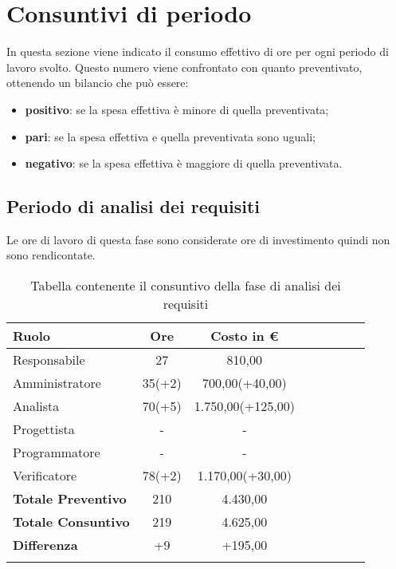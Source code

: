 \section{Consuntivi di periodo} \label{_consuntivo}
In questa sezione viene indicato il consumo effettivo di ore per ogni periodo di lavoro svolto. Questo numero viene confrontato con quanto preventivato, ottenendo un bilancio che può essere:
\begin{itemize}
    \item \textbf{positivo}: se la spesa effettiva è minore di quella preventivata;
    \item \textbf{pari}: se la spesa effettiva e quella preventivata sono uguali;
    \item \textbf{negativo}:  se la spesa effettiva è maggiore di quella preventivata.
\end{itemize}

\subsection{Periodo di analisi dei requisiti} \label{_consuntivoAnalisiDeiRequisiti}
Le ore di lavoro di questa fase sono considerate ore di investimento quindi non sono rendicontate.
            				
			\begin{longtable}{|l|c|c|c|c|c|c|c|}
				\hline
				\rowcolor{lighter-grayer}
				\textbf{Ruolo} & \textbf{Ore} & \textbf{Costo in €} \\
				\hline
				\endfirsthead
				
				\hline
				Responsabile & 27 & 810,00\\
				\hline
				\hline
				Amministratore & 35(+2) & 700,00(+40,00)\\
				\hline
				\hline
				Analista & 70(+5) & 1.750,00(+125,00)\\
				\hline
				\hline
				Progettista & - & -\\
				\hline
				\hline
				Programmatore & - & -\\
				\hline
				\hline
				Verificatore & 78(+2) & 1.170,00(+30,00)\\
				\hline
                \textbf{Totale Preventivo} & 210 & 4.430,00\\
                \hline
				\hline
                \textbf{Totale Consuntivo} & 219 & 4.625,00\\
                \hline
                \hline
                \textbf{Differenza} & +9 & +195,00\\
				\hline
				\rowcolor{white}
				\caption{Tabella contenente il consuntivo della fase di analisi dei requisiti}
			\end{longtable}
